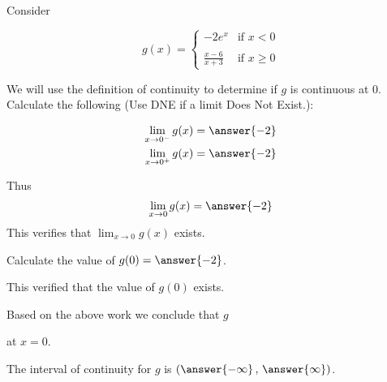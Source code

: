 \documentclass{ximera}
\author{Nela Lakos \and Kyle Parsons \and Bobby Ramsey}
\begin{document}
\begin{exercise}

Consider

\[
g(x) = 
\begin{cases}
-2e^x & \text{if }x<0\\ \\
\frac{x-6}{x+3} & \text{if }x\geq0
\end{cases}
\]

We will use the definition of continuity to determine if $g$ is continuous at 0.  Calculate the following (Use DNE if a limit Does Not Exist.): 

\begin{align*}
	\lim_{x\to0^-}g(x) &= \answer{-2}\\
	\lim_{x\to0^+}g(x) &= \answer{-2}
\end{align*}

Thus \[ \lim_{x\to0}g(x) = \answer{-2} \]
This verifies that $\displaystyle \lim_{x\to 0} g(x)$ exists.


Calculate the value of $g(0)= \answer{-2}$.

This verified that the value of $g(0)$ exists.

\begin{exercise}

Based on the above work we conclude that $g$
\begin{multipleChoice}
\end{multipleChoice}
at $x=0$.

\begin{exercise}

The interval of continuity for $g$ is $\left(\answer{-\infty}\, , \,\answer{\infty}\right)$.

\end{exercise}
\end{exercise}
\end{exercise}
\end{document}
